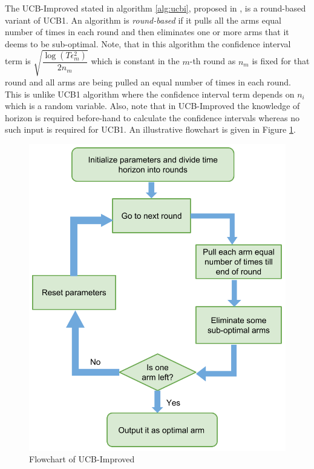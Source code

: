     The UCB-Improved  stated in algorithm \ref{alg:ucbi}, proposed in \citet{auer2010ucb}, is a round-based variant of UCB1. An algorithm is \textit{round-based} if it pulls all the arms equal number of times in each round and then eliminates one or more arms that it deems to be sub-optimal. Note, that in this algorithm the confidence interval term is $\sqrt{\dfrac{\log{( T\epsilon_{m}^{2})}}{2 n_{m}}}$ which is constant in the $m$-th round as $n_m$ is fixed for that round and all arms are being pulled an equal number of times in each round. This is unlike UCB1 algorithm where the confidence interval term depends on $n_i$ which is a random variable. Also, note that in UCB-Improved the knowledge of horizon is required before-hand to calculate the confidence intervals whereas no such input is required for UCB1. An illustrative flowchart is given in Figure \ref{fig:ucbimp}.
    
\begin{figure}[!th]
\includegraphics[scale=0.5]{Chapter2/img/Ucb-Imp.png}
\caption{Flowchart of UCB-Improved}
\label{fig:ucbimp}
\end{figure}
    
